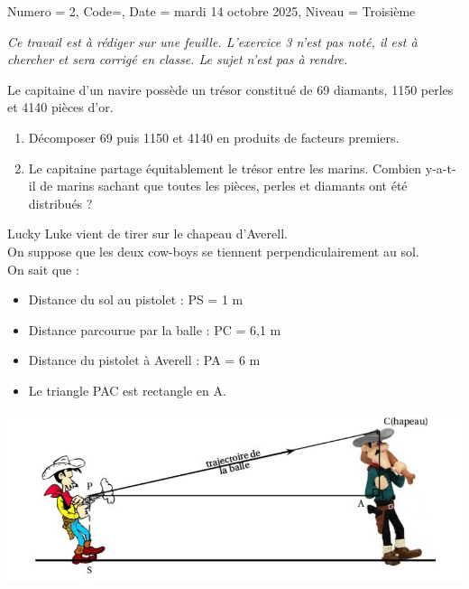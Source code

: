 \documentclass[11pt]{article}
\begin{document}
\begin{Maquette}[DM]{
        Numero = 2, Code={}, Date = mardi 14 octobre 2025, Niveau = Troisième
    }


    \emph{Ce travail est à rédiger sur une feuille. L’exercice 3 n’est pas noté, il est à chercher et sera corrigé en classe. Le sujet n’est pas à rendre.}


    
    
    \begin{exercice}
        Le capitaine d’un navire possède un trésor constitué de 69 diamants, 1150 perles et 4140 pièces d’or.
        \begin{enumerate}
            \item Décomposer 69 puis 1150 et 4140 en produits de facteurs premiers.
            \item  Le capitaine partage équitablement le trésor entre les marins. Combien y-a-t-il de marins sachant que toutes les pièces, perles et diamants ont été distribués ?
            
        \end{enumerate}
    \end{exercice}
    
    \begin{exercice}
        Lucky Luke vient de tirer sur le chapeau d’Averell.\\
        On suppose que les deux cow-boys se tiennent perpendiculairement au sol.\\
        On sait que :
        \begin{itemize}
            \item Distance du sol au pistolet : PS = 1 m
            \item Distance parcourue par la balle : PC = 6,1 m
            \item Distance du pistolet à Averell : PA = 6 m
            \item Le triangle PAC est rectangle en A.
        \end{itemize}

        \begin{center}
            \includegraphics[width=.7\linewidth]{Images/DM2-LuckyLuke.png}
        \end{center}


\end{exercice}
\end{Maquette}
\end{document}

